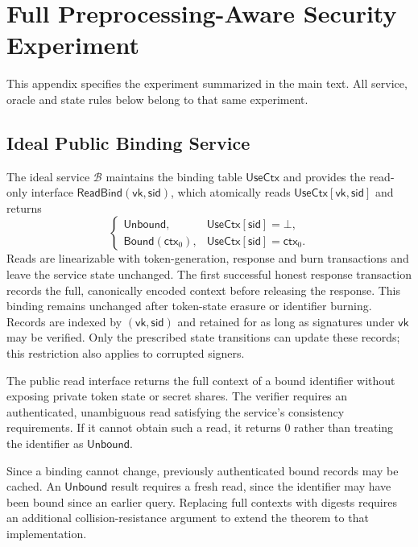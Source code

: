 \documentclass[lettersize,journal]{IEEEtran}
\begin{document}
\appendices
\section{Full Preprocessing-Aware Security Experiment}
\label{app:pa-security-model}

This appendix specifies the experiment summarized in the main text.
All service, oracle and state rules below belong to that same experiment.

\subsection{Ideal Public Binding Service}
The ideal service $\mathcal B$ maintains the binding table
$\mathsf{UseCtx}$ and provides the read-only interface
$\mathsf{ReadBind}(\mathsf{vk},\mathsf{sid})$, which atomically reads
$\mathsf{UseCtx}[\mathsf{vk},\mathsf{sid}]$ and returns
\[
\begin{cases}
\mathsf{Unbound}, & \mathsf{UseCtx}[\mathsf{sid}]=\bot,\\
\mathsf{Bound}(\mathsf{ctx}_0),
 & \mathsf{UseCtx}[\mathsf{sid}]=\mathsf{ctx}_0.
\end{cases}
\]
Reads are linearizable with token-generation, response and burn
transactions and leave the service state unchanged. The first successful
honest response transaction records the full, canonically encoded context
before releasing the response. This binding remains unchanged after
token-state erasure or identifier burning. Records are indexed by
$(\mathsf{vk},\mathsf{sid})$ and retained for as long as signatures under
$\mathsf{vk}$ may be verified. Only the prescribed state transitions can
update these records; this restriction also applies to corrupted signers.

The public read interface returns the full context of a bound identifier
without exposing private token state or secret shares. The verifier
requires an authenticated, unambiguous read satisfying the service's
consistency requirements. If it cannot obtain such a read, it returns $0$
rather than treating the identifier as $\mathsf{Unbound}$.

Since a binding cannot change, previously authenticated bound records may
be cached. An $\mathsf{Unbound}$ result requires a fresh read, since the
identifier may have been bound since an earlier query. Replacing full
contexts with digests requires an additional collision-resistance argument
to extend the theorem to that implementation.
\end{document}
